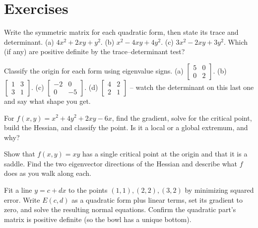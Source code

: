 \section*{Exercises}

\begin{exercise}
\label{ch36:exr-build}
Write the symmetric matrix for each quadratic form, then state its trace and
determinant. (a) $4x^2 + 2xy + y^2$. (b) $x^2 - 4xy + 4y^2$. (c) $3x^2 - 2xy + 3y^2$.
Which (if any) are positive definite by the trace--determinant test?
\end{exercise}

\begin{exercise}
\label{ch36:exr-classify}
Classify the origin for each form using eigenvalue signs.
(a) $\begin{bmatrix}5&0\\0&2\end{bmatrix}$. (b) $\begin{bmatrix}1&3\\3&1\end{bmatrix}$.
(c) $\begin{bmatrix}-2&0\\0&-5\end{bmatrix}$. (d) $\begin{bmatrix}4&2\\2&1\end{bmatrix}$
-- watch the determinant on this last one and say what shape you get.
\end{exercise}

\begin{exercise}
\label{ch36:exr-critical}
For $f(x,y)=x^2 + 4y^2 + 2xy - 6x$, find the gradient, solve for the critical point,
build the Hessian, and classify the point. Is it a local or a global extremum, and
why?
\end{exercise}

\begin{exercise}
\label{ch36:exr-saddle}
Show that $f(x,y)=xy$ has a single critical point at the origin and that it is a
saddle. Find the two eigenvector directions of the Hessian and describe what $f$ does
as you walk along each.
\end{exercise}

\begin{exercise}
\label{ch36:exr-lsq}
Fit a line $y=c+dx$ to the points $(1,1),(2,2),(3,2)$ by minimizing squared error.
Write $E(c,d)$ as a quadratic form plus linear terms, set its gradient to zero, and
solve the resulting normal equations. Confirm the quadratic part's matrix is positive
definite (so the bowl has a unique bottom).
\end{exercise}

